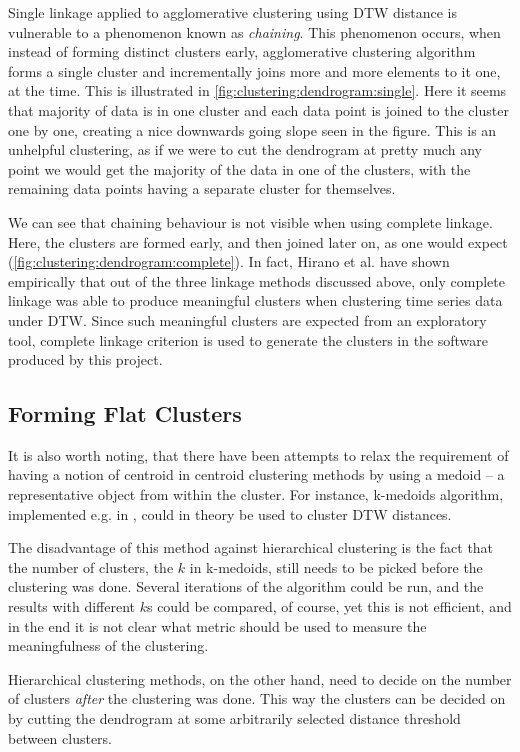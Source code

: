 \documentclass[parskip]{cs4rep}
\begin{document}
Single linkage applied to agglomerative clustering using DTW distance is vulnerable to a phenomenon known as \emph{chaining}. This phenomenon occurs, when instead of forming distinct clusters early, agglomerative clustering algorithm forms a single cluster and incrementally joins more and more elements to it one, at the time. This is illustrated in \autoref{fig:clustering:dendrogram:single}. 
Here it seems that majority of data is in one cluster and each data point is joined to the cluster one by one, creating a nice downwards going slope seen in the figure. This is an unhelpful clustering, as 
if we were to cut the dendrogram at pretty much any point we would get the majority of the data in one of the clusters, with the remaining data points having a separate cluster for themselves. 

We can see that chaining behaviour is not visible when using complete linkage. Here, the clusters are formed early, and then joined later on, as one would expect (\autoref{fig:clustering:dendrogram:complete}). In fact, Hirano et al. \cite{Hirano:2005wh} have shown empirically that out of the three linkage methods discussed above, only complete linkage was able to produce meaningful clusters when clustering time series data under DTW. Since such meaningful clusters are expected from an exploratory tool, complete linkage criterion is used to generate the clusters
in the software produced by this project.

\subsection{Forming Flat Clusters}

It is also worth noting, that there have been attempts to relax the requirement of having a notion of centroid in centroid clustering methods by using a medoid -- a representative object from within the cluster. For instance, k-medoids algorithm, implemented e.g. in \cite{Park:2009ks}, could in theory be used to cluster DTW distances. 

The disadvantage of this method against hierarchical clustering is the fact that the number of clusters, the $k$ in k-medoids, still needs to be picked before the clustering was done. Several iterations of the algorithm could be run, and the results with different $k$s could be compared, of course, yet this is not efficient, and in the end it is not clear what metric should be used to
measure the meaningfulness of the clustering.

Hierarchical clustering methods, on the other hand, need to decide on the number of clusters \emph{after} the clustering was done. This way the clusters can be decided on by cutting the dendrogram at some arbitrarily selected distance threshold between clusters. 
\end{document}
